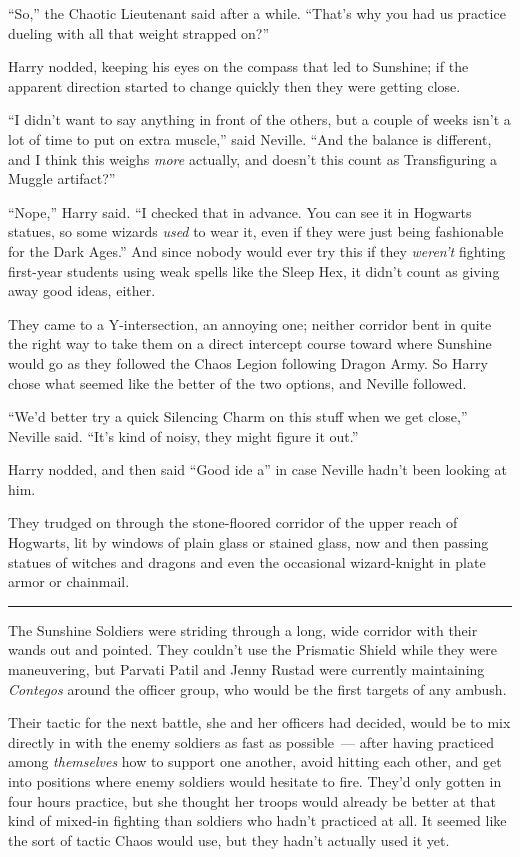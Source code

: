 ``So,'' the Chaotic Lieutenant said after a while. ``That's why you had us practice dueling with all that weight strapped on?''

Harry nodded, keeping his eyes on the compass that led to Sunshine; if the apparent direction started to change quickly then they were getting close.

``I didn't want to say anything in front of the others, but a couple of weeks isn't a lot of time to put on extra muscle,'' said Neville. ``And the balance is different, and I think this weighs \emph{more} actually, and doesn't this count as Transfiguring a Muggle artifact?''

``Nope,'' Harry said. ``I checked that in advance. You can see it in Hogwarts statues, so some wizards \emph{used} to wear it, even if they were just being fashionable for the Dark Ages.'' And since nobody would ever try this if they \emph{weren't} fighting first-year students using weak spells like the Sleep Hex, it didn't count as giving away good ideas, either.

They came to a Y-intersection, an annoying one; neither corridor bent in quite the right way to take them on a direct intercept course toward where Sunshine would go as they followed the Chaos Legion following Dragon Army. So Harry chose what seemed like the better of the two options, and Neville followed.

``We'd better try a quick Silencing Charm on this stuff when we get close,'' Neville said. ``It's kind of noisy, they might figure it out.''

Harry nodded, and then said ``Good ide a'' in case Neville hadn't been looking at him.

They trudged on through the stone-floored corridor of the upper reach of Hogwarts, lit by windows of plain glass or stained glass, now and then passing statues of witches and dragons and even the occasional wizard-knight in plate armor or chainmail.

\begin{center}\rule{3in}{0.4pt}\end{center}

The Sunshine Soldiers were striding through a long, wide corridor with their wands out and pointed. They couldn't use the Prismatic Shield while they were maneuvering, but Parvati Patil and Jenny Rustad were currently maintaining \emph{Contegos} around the officer group, who would be the first targets of any ambush.

Their tactic for the next battle, she and her officers had decided, would be to mix directly in with the enemy soldiers as fast as possible~--- after having practiced among \emph{themselves} how to support one another, avoid hitting each other, and get into positions where enemy soldiers would hesitate to fire. They'd only gotten in four hours practice, but she thought her troops would already be better at that kind of mixed-in fighting than soldiers who hadn't practiced at all. It seemed like the sort of tactic Chaos would use, but they hadn't actually used it yet.

